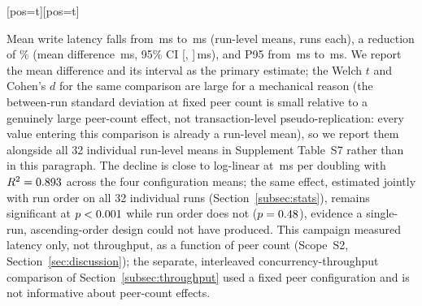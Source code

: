 \documentclass[a4paper,fleqn]{cas-sc}
\makeatletter
\newenvironment{widefig}[1][pos=t]
  {\ifdoublecol \@nameuse{figure*}[#1]\else \@nameuse{figure}[#1]\fi}
  {\ifdoublecol \@nameuse{endfigure*}\else \@nameuse{endfigure}\fi}
\makeatother
\begin{document}
\begin{widefig}
\centering
{}
\caption{Run-level write latency and 95\% confidence intervals by configured logical peer count.}
\label{fig:scaling}
\end{widefig}

Mean write latency falls from \ScaleMinPeerMean\,ms to \ScaleMaxPeerMean\,ms
(run-level means, \PartRunsPerConfig{} runs each), a reduction of
\ScaleLatencyDropPct\% (mean difference \ScaleDiffMs\,ms, 95\% CI
[\ScaleDiffCILow, \ScaleDiffCIHigh]\,ms), and P95 from
\ScaleMinPeerPNinetyFive\,ms to \ScaleMaxPeerPNinetyFive\,ms. We report the
mean difference and its interval as the primary estimate; the Welch $t$
and Cohen's $d$ for the same comparison are large for a mechanical reason
(the between-run standard deviation at fixed peer count is small relative
to a genuinely large peer-count effect, not transaction-level
pseudo-replication: every value entering this comparison is already a
run-level mean), so we report them alongside all 32 individual run-level
means in Supplement Table~S7 rather than in this paragraph. The decline is
close to
log-linear at \ScaleSlope\,ms per doubling with $R^2 = 0.893$
across the four configuration means; the same effect, estimated jointly
with run order on all 32 individual runs (Section~\ref{subsec:stats}),
remains significant at $p<0.001$ while run order does not
($p=0.48$), evidence a single-run, ascending-order design
could not have produced. This campaign measured latency only, not
throughput, as a function of peer count (Scope~S2,
Section~\ref{sec:discussion}); the separate, interleaved
concurrency-throughput comparison of Section~\ref{subsec:throughput} used
a fixed peer configuration and is not informative about peer-count
effects.
\end{document}

